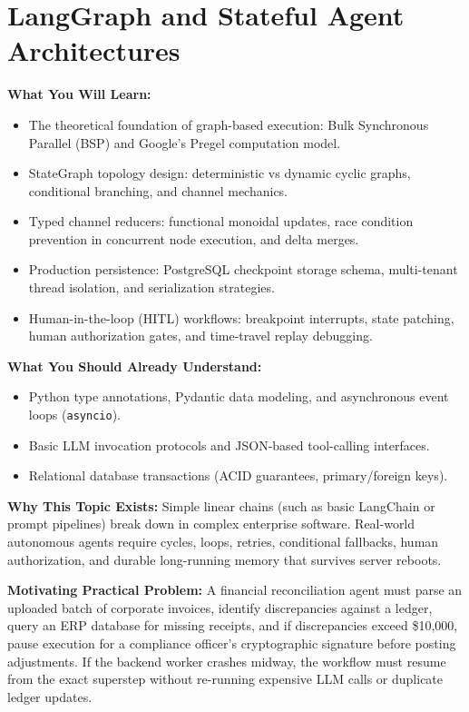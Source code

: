 \chapter{LangGraph and Stateful Agent Architectures}
\label{ch:langgraph}

\begin{chaptergoalsbox}
\textbf{What You Will Learn:}
\begin{itemize}[leftmargin=15pt]
  \item The theoretical foundation of graph-based execution: Bulk Synchronous Parallel (BSP) and Google's Pregel computation model.
  \item StateGraph topology design: deterministic vs dynamic cyclic graphs, conditional branching, and channel mechanics.
  \item Typed channel reducers: functional monoidal updates, race condition prevention in concurrent node execution, and delta merges.
  \item Production persistence: PostgreSQL checkpoint storage schema, multi-tenant thread isolation, and serialization strategies.
  \item Human-in-the-loop (HITL) workflows: breakpoint interrupts, state patching, human authorization gates, and time-travel replay debugging.
\end{itemize}

\textbf{What You Should Already Understand:}
\begin{itemize}[leftmargin=15pt]
  \item Python type annotations, Pydantic data modeling, and asynchronous event loops (\texttt{asyncio}).
  \item Basic LLM invocation protocols and JSON-based tool-calling interfaces.
  \item Relational database transactions (ACID guarantees, primary/foreign keys).
\end{itemize}

\textbf{Why This Topic Exists:}
Simple linear chains (such as basic LangChain or prompt pipelines) break down in complex enterprise software. Real-world autonomous agents require cycles, loops, retries, conditional fallbacks, human authorization, and durable long-running memory that survives server reboots.

\textbf{Motivating Practical Problem:}
A financial reconciliation agent must parse an uploaded batch of corporate invoices, identify discrepancies against a ledger, query an ERP database for missing receipts, and if discrepancies exceed \$10,000, pause execution for a compliance officer's cryptographic signature before posting adjustments. If the backend worker crashes midway, the workflow must resume from the exact superstep without re-running expensive LLM calls or duplicate ledger updates.
\end{chaptergoalsbox}

